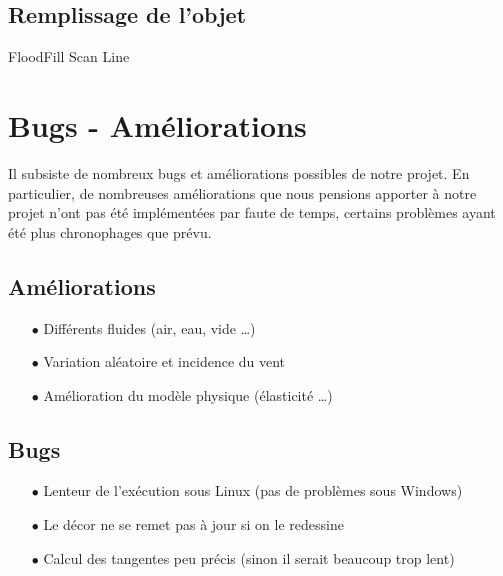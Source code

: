 \subsection{Remplissage de l'objet}
FloodFill Scan Line


\section{Bugs - Améliorations}
Il subsiste de nombreux bugs et améliorations possibles de notre projet.
En particulier, de nombreuses améliorations que nous pensions apporter
à notre projet n'ont pas été implémentées par faute de temps, certains 
problèmes ayant été plus chronophages que prévu.
\subsection{Améliorations}
\begin{itemize}
\item[$\bullet$] Différents fluides (air, eau, vide \dots)
\item[$\bullet$] Variation aléatoire et incidence du vent 
\item[$\bullet$] Amélioration du modèle physique (élasticité \dots)
\end{itemize}
\subsection{Bugs}
\begin{itemize}
\item[$\bullet$] Lenteur de l'exécution sous Linux (pas de problèmes sous Windows)
\item[$\bullet$] Le décor ne se remet pas à jour si on le redessine
\item[$\bullet$] Calcul des tangentes peu précis (sinon il serait beaucoup trop lent)
\end{itemize}

